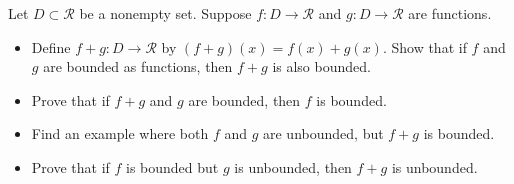 \documentclass[11 pt]{article}
\begin{document}
\pagebreak
\begin{problem}
	Let $D\subset\mathcal{R}$ be a nonempty set. Suppose $f:D\rightarrow\mathcal{R}$ and $g:D\rightarrow\mathcal{R}$ are functions.
	\begin{itemize}
		\item Define $f+g:D\rightarrow\mathcal{R}$ by $(f+g)(x)=f(x)+g(x)$. Show that if $f$ and $g$ are bounded as functions, then $f+g$ is also bounded.
		\item Prove that if $f+g$ and $g$ are bounded, then $f$ is bounded.
		\item Find an example where both $f$ and $g$ are unbounded, but $f+g$ is bounded.
		\item Prove that if $f$ is bounded but $g$ is unbounded, then $f+g$ is unbounded.
	\end{itemize}
\end{problem}
\end{document}
